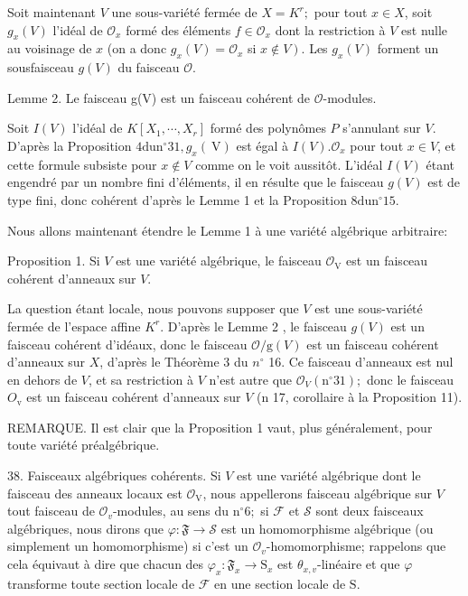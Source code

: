 Soit maintenant $V$ une sous-variété fermée de $X=K^{r} ;$ pour tout $x \in X$, soit $g_{x}(V)$ l'idéal de $\mathcal{O}_{x}$ formé des éléments $f \in \mathcal{O}_{x}$ dont la restriction à $V$ est nulle au voisinage de $x$ (on a donc $g_{x}(V)=\mathcal{O}_{x}$ si $\left.x \notin V\right)$. Les $g_{x}(V)$ forment un sousfaisceau $g(V)$ du faisceau $\mathcal{O}$.

Lemme 2. Le faisceau g(V) est un faisceau cohérent de $\mathcal{O}$-modules.

Soit $I(V)$ l'idéal de $K\left[X_{1}, \cdots, X_{r}\right]$ formé des polynômes $P$ s'annulant sur $V$. D'après la Proposition $4 \mathrm{du} \mathrm{n}^{\circ} 31, g_{x}(\mathrm{~V})$ est égal à $I(V) . \mathcal{O}_{x}$ pour tout $x \in V$, et cette formule subsiste pour $x \notin V$ comme on le voit aussitôt. L'idéal $I(V)$ étant engendré par un nombre fini d'éléments, il en résulte que le faisceau $g(V)$ est de type fini, donc cohérent d'après le Lemme 1 et la Proposition $8 \mathrm{du} \mathrm{n}^{\circ} 15$.

Nous allons maintenant étendre le Lemme 1 à une variété algébrique arbitraire:

Proposition 1. Si $V$ est une variété algébrique, le faisceau $\mathcal{O}_{\mathrm{V}}$ est un faisceau cohérent d'anneaux sur $V$.

La question étant locale, nous pouvons supposer que $V$ est une sous-variété fermée de l'espace affine $K^{r}$. D'après le Lemme 2 , le faisceau $g(V)$ est un faisceau cohérent d'idéaux, donc le faisceau $\mathcal{O} / \mathrm{g}(V)$ est un faisceau cohérent d'anneaux sur $X$, d'après le Théorème 3 du $n^{\circ}$ 16. Ce faisceau d'anneaux est nul en dehors de $V$, et sa restriction à $V$ n'est autre que $\mathcal{O}_{V}\left(\mathrm{n}^{\circ} 31\right) ;$ donc le faisceau ${O}_{\mathrm{v}}$ est un faisceau cohérent d'anneaux sur $V$ (n 17, corollaire à la Proposition 11).

REMARQUE. Il est clair que la Proposition 1 vaut, plus généralement, pour toute variété préalgébrique.

38. Faisceaux algébriques cohérents. Si $V$ est une variété algébrique dont le faisceau des anneaux locaux est $\mathcal{O}_{\mathrm{V}}$, nous appellerons faisceau algébrique sur $V$ tout faisceau de $\mathcal{O}_{v}$-modules, au sens du $\mathrm{n}^{\circ} 6 ;$ si $\mathcal{F}$ et $\mathcal{S}$ sont deux faisceaux algébriques, nous dirons que $\varphi: \mathfrak{F} \rightarrow \mathcal{S}$ est un homomorphisme algébrique (ou simplement un homomorphisme) si c'est un $\mathcal{O}_{v}$-homomorphisme; rappelons que cela équivaut à dire que chacun des $\varphi_{x}: \mathfrak{F}_{x} \rightarrow \mathrm{S}_{x}$ est $\mathcal{\theta}_{x, v}$-linéaire et que $\varphi$ transforme toute section locale de $\mathcal{F}$ en une section locale de $\mathrm{S}$.

